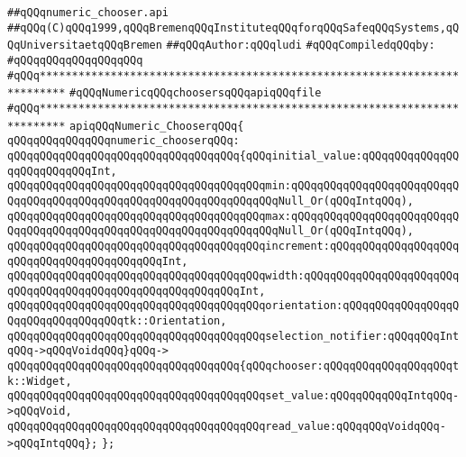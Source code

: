 \label{src/lib/tk/src/toolkit/numeric_chooser.api}
\verb|##qQQqnumeric_chooser.api|\newline
\verb|##qQQq(C)qQQq1999,qQQqBremenqQQqInstituteqQQqforqQQqSafeqQQqSystems,qQQqUniversitaetqQQqBremen|\newline
\verb|##qQQqAuthor:qQQqludi|\newline
\newline
\verb|#qQQqCompiledqQQqby:|\newline
\verb|#qQQqqQQqqQQqqQQqqQQq|\newline
\newline
\newline
\verb|#qQQq**************************************************************************|\newline
\verb|#qQQqNumericqQQqchoosersqQQqapiqQQqfile|\newline
\verb|#qQQq**************************************************************************|\newline
\newline
\newline
\verb|apiqQQqNumeric_ChooserqQQq{|\newline
\newline
\verb|qQQqqQQqqQQqqQQqnumeric_chooserqQQq:|\newline
\verb|qQQqqQQqqQQqqQQqqQQqqQQqqQQqqQQqqQQq{qQQqinitial_value:qQQqqQQqqQQqqQQqqQQqqQQqqQQqInt,|\newline
\verb|qQQqqQQqqQQqqQQqqQQqqQQqqQQqqQQqqQQqqQQqmin:qQQqqQQqqQQqqQQqqQQqqQQqqQQqqQQqqQQqqQQqqQQqqQQqqQQqqQQqqQQqqQQqqQQqNull_Or(qQQqIntqQQq),|\newline
\verb|qQQqqQQqqQQqqQQqqQQqqQQqqQQqqQQqqQQqqQQqmax:qQQqqQQqqQQqqQQqqQQqqQQqqQQqqQQqqQQqqQQqqQQqqQQqqQQqqQQqqQQqqQQqqQQqNull_Or(qQQqIntqQQq),|\newline
\verb|qQQqqQQqqQQqqQQqqQQqqQQqqQQqqQQqqQQqqQQqincrement:qQQqqQQqqQQqqQQqqQQqqQQqqQQqqQQqqQQqqQQqqQQqInt,|\newline
\verb|qQQqqQQqqQQqqQQqqQQqqQQqqQQqqQQqqQQqqQQqwidth:qQQqqQQqqQQqqQQqqQQqqQQqqQQqqQQqqQQqqQQqqQQqqQQqqQQqqQQqqQQqInt,|\newline
\verb|qQQqqQQqqQQqqQQqqQQqqQQqqQQqqQQqqQQqqQQqorientation:qQQqqQQqqQQqqQQqqQQqqQQqqQQqqQQqqQQqtk::Orientation,|\newline
\verb|qQQqqQQqqQQqqQQqqQQqqQQqqQQqqQQqqQQqqQQqselection_notifier:qQQqqQQqIntqQQq->qQQqVoidqQQq}qQQq->|\newline
\verb|qQQqqQQqqQQqqQQqqQQqqQQqqQQqqQQqqQQq{qQQqchooser:qQQqqQQqqQQqqQQqqQQqtk::Widget,|\newline
\verb|qQQqqQQqqQQqqQQqqQQqqQQqqQQqqQQqqQQqqQQqset_value:qQQqqQQqqQQqIntqQQq->qQQqVoid,|\newline
\verb|qQQqqQQqqQQqqQQqqQQqqQQqqQQqqQQqqQQqqQQqread_value:qQQqqQQqVoidqQQq->qQQqIntqQQq};|\newline
\verb|};|\newline

